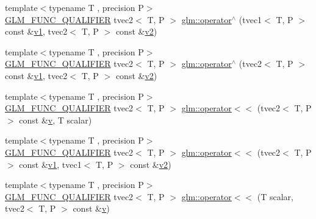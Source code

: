 \begin{DoxyCompactItemize}
\item 
{\footnotesize template$<$typename T , precision P$>$ }\\\mbox{\hyperlink{setup_8hpp_a33fdea6f91c5f834105f7415e2a64407}{G\+L\+M\+\_\+\+F\+U\+N\+C\+\_\+\+Q\+U\+A\+L\+I\+F\+I\+ER}} tvec2$<$ T, P $>$ \mbox{\hyperlink{namespaceglm_ae1375379a905386c9add9a67000dffc1}{glm\+::operator$^\wedge$}} (tvec1$<$ T, P $>$ const \&\mbox{\hyperlink{glad_8h_a0779c3b73f9aa3a0ac5b0139b5d291d9}{v1}}, tvec2$<$ T, P $>$ const \&\mbox{\hyperlink{glad_8h_a9a09a1837922b2b806f4589096a52049}{v2}})
\item 
{\footnotesize template$<$typename T , precision P$>$ }\\\mbox{\hyperlink{setup_8hpp_a33fdea6f91c5f834105f7415e2a64407}{G\+L\+M\+\_\+\+F\+U\+N\+C\+\_\+\+Q\+U\+A\+L\+I\+F\+I\+ER}} tvec2$<$ T, P $>$ \mbox{\hyperlink{namespaceglm_afd5cb6d346e14623afaf65971b38cd69}{glm\+::operator$^\wedge$}} (tvec2$<$ T, P $>$ const \&\mbox{\hyperlink{glad_8h_a0779c3b73f9aa3a0ac5b0139b5d291d9}{v1}}, tvec2$<$ T, P $>$ const \&\mbox{\hyperlink{glad_8h_a9a09a1837922b2b806f4589096a52049}{v2}})
\item 
{\footnotesize template$<$typename T , precision P$>$ }\\\mbox{\hyperlink{setup_8hpp_a33fdea6f91c5f834105f7415e2a64407}{G\+L\+M\+\_\+\+F\+U\+N\+C\+\_\+\+Q\+U\+A\+L\+I\+F\+I\+ER}} tvec2$<$ T, P $>$ \mbox{\hyperlink{namespaceglm_a1a7d9a61ddde7929bdd704e4b708c777}{glm\+::operator$<$$<$}} (tvec2$<$ T, P $>$ const \&\mbox{\hyperlink{glad_8h_a14cfbe2fc2234f5504618905b69d1e06}{v}}, T scalar)
\item 
{\footnotesize template$<$typename T , precision P$>$ }\\\mbox{\hyperlink{setup_8hpp_a33fdea6f91c5f834105f7415e2a64407}{G\+L\+M\+\_\+\+F\+U\+N\+C\+\_\+\+Q\+U\+A\+L\+I\+F\+I\+ER}} tvec2$<$ T, P $>$ \mbox{\hyperlink{namespaceglm_a74ac4dc2fb21fb636970af8cfc417235}{glm\+::operator$<$$<$}} (tvec2$<$ T, P $>$ const \&\mbox{\hyperlink{glad_8h_a0779c3b73f9aa3a0ac5b0139b5d291d9}{v1}}, tvec1$<$ T, P $>$ const \&\mbox{\hyperlink{glad_8h_a9a09a1837922b2b806f4589096a52049}{v2}})
\item 
{\footnotesize template$<$typename T , precision P$>$ }\\\mbox{\hyperlink{setup_8hpp_a33fdea6f91c5f834105f7415e2a64407}{G\+L\+M\+\_\+\+F\+U\+N\+C\+\_\+\+Q\+U\+A\+L\+I\+F\+I\+ER}} tvec2$<$ T, P $>$ \mbox{\hyperlink{namespaceglm_a2a8deb10ffbd4309bfd30236df85c9ac}{glm\+::operator$<$$<$}} (T scalar, tvec2$<$ T, P $>$ const \&\mbox{\hyperlink{glad_8h_a14cfbe2fc2234f5504618905b69d1e06}{v}})

\end{DoxyCompactItemize}
